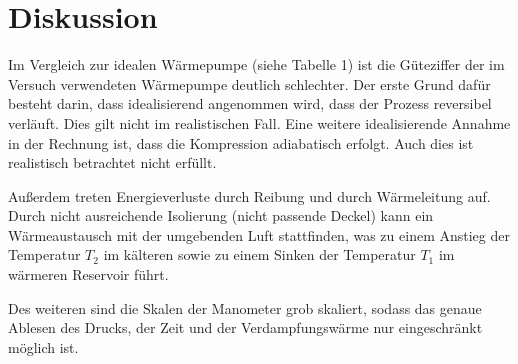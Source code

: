 \section{Diskussion}
\label{sec:Diskussion}

Im Vergleich zur idealen Wärmepumpe (siehe Tabelle 1) ist die Güteziffer der im Versuch verwendeten Wärmepumpe deutlich schlechter. Der erste Grund dafür besteht darin, dass idealisierend angenommen wird, dass der Prozess reversibel verläuft. Dies gilt nicht im realistischen Fall. Eine weitere idealisierende Annahme in der Rechnung ist, dass die Kompression adiabatisch erfolgt. Auch dies ist realistisch betrachtet nicht erfüllt.

Außerdem treten Energieverluste durch Reibung und durch Wärmeleitung auf. Durch nicht ausreichende Isolierung (nicht passende Deckel) kann ein Wärmeaustausch mit der umgebenden Luft stattfinden, was zu einem Anstieg der Temperatur $T_{2}$ im kälteren sowie zu einem Sinken der Temperatur $T_{1}$ im wärmeren Reservoir führt.

Des weiteren sind die Skalen der Manometer grob skaliert, sodass das genaue Ablesen des Drucks, der Zeit und der Verdampfungswärme nur eingeschränkt möglich ist.
